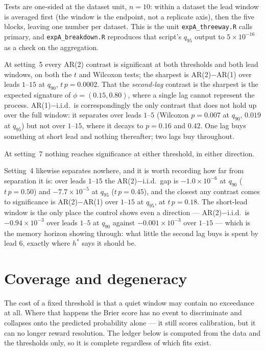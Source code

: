 \documentclass[11pt]{article}
\newcommand{\code}[1]{\texttt{#1}}
\begin{document}
\noindent Tests are one-sided at the dataset unit, $n = 10$: within a
dataset the lead window is averaged first (the window is the endpoint,
not a replicate axis), then the five blocks, leaving one number per
dataset. This is the unit \code{expA\_threeway.R} calls primary, and
\code{expA\_breakdown.R} reproduces that script's $q_{95}$ output to
$5 \times 10^{-16}$ as a check on the aggregation.

At setting~5 every AR(2) contrast is significant at both thresholds and
both lead windows, on both the $t$ and Wilcoxon tests; the sharpest is
AR(2)$-$AR(1) over leads $1$--$15$ at $q_{90}$, $t\,p = 0.0002$. That the
\emph{second-lag} contrast is the sharpest is the expected signature of
$\phi = (0.15, 0.80)$, where a single lag cannot represent the process.
AR(1)$-$i.i.d.\ is correspondingly the only contrast that does not hold
up over the full window: it separates over leads $1$--$5$ (Wilcoxon
$p = 0.007$ at $q_{90}$, $0.019$ at $q_{95}$) but not over $1$--$15$,
where it decays to $p = 0.16$ and $0.42$. One lag buys something at short
lead and nothing thereafter; two lags buy throughout.

At setting~7 nothing reaches significance at either threshold, in either
direction.

Setting~4 likewise separates nowhere, and it is worth recording how far
from separation it is: over leads $1$--$15$ the AR(2)$-$i.i.d.\ gap is
$-1.0 \times 10^{-6}$ at $q_{90}$ ($t\,p = 0.50$) and
$-7.7 \times 10^{-5}$ at $q_{95}$ ($t\,p = 0.45$), and the closest any
contrast comes to significance is AR(2)$-$AR(1) over $1$--$15$ at
$q_{95}$, at $t\,p = 0.18$. The short-lead window is the only place the
control shows even a direction --- AR(2)$-$i.i.d.\ is
$-0.94 \times 10^{-3}$ over leads $1$--$5$ at $q_{90}$ against
$-0.001 \times 10^{-3}$ over $1$--$15$ --- which is the memory horizon
showing through: what little the second lag buys is spent by lead $6$,
exactly where $h^\ast$ says it should be.

\section{Coverage and degeneracy}
\label{sec:coverage}

The cost of a fixed threshold is that a quiet window may contain no
exceedance at all. Where that happens the Brier score has no event to
discriminate and collapses onto the predicted probability alone --- it
still scores calibration, but it can no longer reward resolution. The
ledger below is computed from the data and the thresholds only, so it is
complete regardless of which fits exist.
\end{document}
